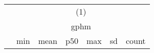 {
\def\sym#1{\ifmmode^{#1}\else\(^{#1}\)\fi}
\begin{tabular}{l*{1}{cccccc}}
\hline\hline
                    &\multicolumn{6}{c}{(1)}                                                      \\
                    &\multicolumn{6}{c}{gphm}                                                     \\
                    &         min&        mean&         p50&         max&          sd&       count\\
\hline
\hline\hline
\end{tabular}
}
